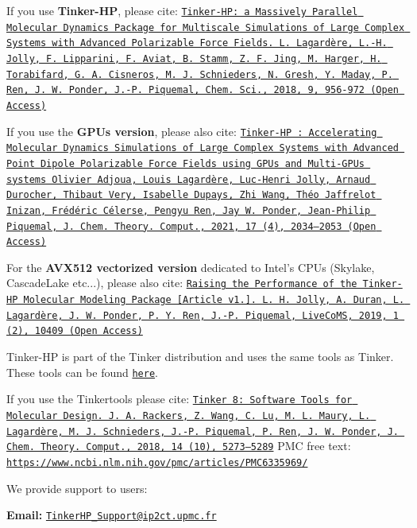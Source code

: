 \begin{DoxyItemize}
\item If you use {\bfseries Tinker-\/\-H\-P}, please cite\-: \href{https://doi.org/10.1039/C7SC04531J}{\tt Tinker-\/\-H\-P\-: a Massively Parallel Molecular Dynamics Package for Multiscale Simulations of Large Complex Systems with Advanced Polarizable Force Fields. L. Lagardère, L.-\/\-H. Jolly, F. Lipparini, F. Aviat, B. Stamm, Z. F. Jing, M. Harger, H. Torabifard, G. A. Cisneros, M. J. Schnieders, N. Gresh, Y. Maday, P. Ren, J. W. Ponder, J.-\/\-P. Piquemal, Chem. Sci., 2018, 9, 956-\/972 (Open Access)}
\item If you use the {\bfseries G\-P\-Us version}, please also cite\-: \href{https://doi.org/10.1021/acs.jctc.0c01164}{\tt Tinker-\/\-H\-P \-: Accelerating Molecular Dynamics Simulations of Large Complex Systems with Advanced Point Dipole Polarizable Force Fields using G\-P\-Us and Multi-\/\-G\-P\-Us systems Olivier Adjoua, Louis Lagardère, Luc-\/\-Henri Jolly, Arnaud Durocher, Thibaut Very, Isabelle Dupays, Zhi Wang, Théo Jaffrelot Inizan, Frédéric Célerse, Pengyu Ren, Jay W. Ponder, Jean-\/\-Philip Piquemal, J. Chem. Theory. Comput., 2021, 17 (4), 2034–2053 (Open Access)}
\item For the {\bfseries A\-V\-X512 vectorized version} dedicated to Intel's C\-P\-Us (Skylake, Cascade\-Lake etc...), please also cite\-: \href{https://doi.org/10.33011/livecoms.1.2.10409}{\tt Raising the Performance of the Tinker-\/\-H\-P Molecular Modeling Package \mbox{[}Article v1.\mbox{]}. L. H. Jolly, A. Duran, L. Lagardère, J. W. Ponder, P. Y. Ren, J.-\/\-P. Piquemal, Live\-Co\-M\-S, 2019, 1 (2), 10409 (Open Access)}
\end{DoxyItemize}

Tinker-\/\-H\-P is part of the Tinker distribution and uses the same tools as Tinker. These tools can be found \href{https://github.com/TinkerTools/tinker}{\tt here}.


\begin{DoxyItemize}
\item If you use the Tinkertools please cite\-: \href{http://dx.doi.org/10.1021/acs.jctc.8b00529}{\tt Tinker 8\-: Software Tools for Molecular Design. J. A. Rackers, Z. Wang, C. Lu, M. L. Maury, L. Lagardère, M. J. Schnieders, J.-\/\-P. Piquemal, P. Ren, J. W. Ponder, J. Chem. Theory. Comput., 2018, 14 (10), 5273–5289} P\-M\-C free text\-: \href{https://www.ncbi.nlm.nih.gov/pmc/articles/PMC6335969/}{\tt https\-://www.\-ncbi.\-nlm.\-nih.\-gov/pmc/articles/\-P\-M\-C6335969/} 


\end{DoxyItemize}

We provide support to users\-:

{\bfseries Email\-:} \href{mailto:TinkerHP_Support@ip2ct.upmc.fr}{\tt Tinker\-H\-P\-\_\-\-Support@ip2ct.\-upmc.\-fr} 